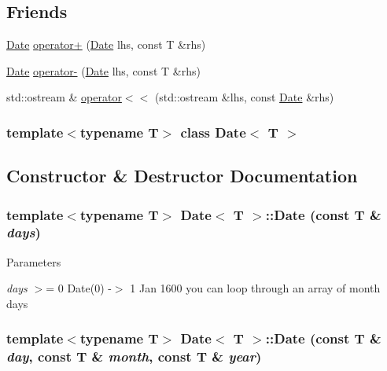 \subsection*{Friends}
\begin{DoxyCompactItemize}
\item 
\hyperlink{classDate}{Date} \hyperlink{classDate_a19ca6a1abad55481ddcf29a3e02d97cc}{operator+} (\hyperlink{classDate}{Date} lhs, const T \&rhs)
\item 
\hyperlink{classDate}{Date} \hyperlink{classDate_a4aa0e233f0db5fb3a64bbf90e3790a74}{operator-\/} (\hyperlink{classDate}{Date} lhs, const T \&rhs)
\item 
std::ostream \& \hyperlink{classDate_ab955963105d77485237321ecadaec058}{operator$<$$<$} (std::ostream \&lhs, const \hyperlink{classDate}{Date} \&rhs)
\end{DoxyCompactItemize}
\subsubsection*{template$<$typename T$>$ class Date$<$ T $>$}



\subsection{Constructor \& Destructor Documentation}
\hypertarget{classDate_af957af1d1b2138d065fda5b555987fb8}{
\subsubsection[{Date}]{\setlength{\rightskip}{0pt plus 5cm}template$<$typename T$>$ {\bf Date}$<$ T $>$::{\bf Date} (const T \& {\em days})}}
\label{classDate_af957af1d1b2138d065fda5b555987fb8}

\begin{DoxyParams}{Parameters}
\item[{\em days}]$>$= 0 Date(0) -\/$>$ 1 Jan 1600 you can loop through an array of month days \end{DoxyParams}
\hypertarget{classDate_a5531478f62a49470143266081c4fe83b}{
\subsubsection[{Date}]{\setlength{\rightskip}{0pt plus 5cm}template$<$typename T$>$ {\bf Date}$<$ T $>$::{\bf Date} (const T \& {\em day}, \/  const T \& {\em month}, \/  const T \& {\em year})}}
\label{classDate_a5531478f62a49470143266081c4fe83b}

